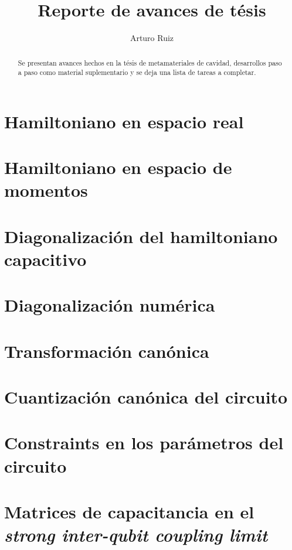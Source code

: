 \documentclass[reprint, superscriptaddress, amsmath, amssymb, aps, prb, floatfix]{revtex4-2}
\begin{document}
\title{Reporte de avances de tésis}
\author{Arturo Ruiz}

\begin{abstract}
    Se presentan avances hechos en la tésis de metamateriales de cavidad, desarrollos paso a paso como material suplementario y se deja una lista de tareas a completar.
\end{abstract}
\maketitle
\section{Hamiltoniano en espacio real}

\section{Hamiltoniano en espacio de momentos}

\section{Diagonalización del hamiltoniano capacitivo}

\section{Diagonalización numérica}

\section{Transformación canónica}

\section{Cuantización canónica del circuito}

\section{Constraints en los parámetros del circuito}

\section{Matrices de capacitancia en el \textit{strong inter-qubit coupling limit}}

\end{document}
